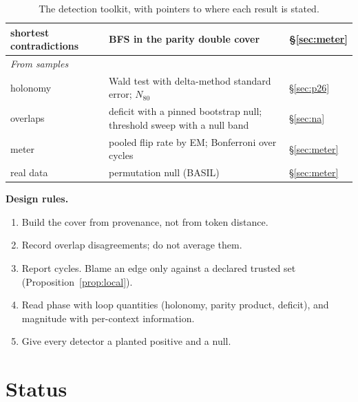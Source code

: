 \documentclass[11pt]{article}
\theoremstyle{definition}
\theoremstyle{remark}
\begin{document}
\begin{table}[h]
\begin{tabular}{p{3.9cm}p{6.6cm}p{2.9cm}}
shortest contradictions & BFS in the parity double cover & \S\ref{sec:meter}\\
\midrule
\multicolumn{3}{l}{\emph{From samples}}\\
holonomy & Wald test with delta-method standard error; $N_{80}$ & \S\ref{sec:p26}\\
overlaps & deficit with a pinned bootstrap null; threshold sweep with a null band & \S\ref{sec:na}\\
meter & pooled flip rate by EM; Bonferroni over cycles & \S\ref{sec:meter}\\
real data & permutation null (BASIL) & \S\ref{sec:meter}\\
\bottomrule
\end{tabular}
\caption{The detection toolkit, with pointers to where each result is stated.}
\end{table}

\noindent\textbf{Design rules.}
\begin{enumerate}
  \item Build the cover from provenance, not from token distance.
  \item Record overlap disagreements; do not average them.
  \item Report cycles. Blame an edge only against a declared trusted set (Proposition~\ref{prop:local}).
  \item Read phase with loop quantities (holonomy, parity product, deficit), and magnitude with per-context information.
  \item Give every detector a planted positive and a null.
\end{enumerate}

\part{Status}
\end{document}

